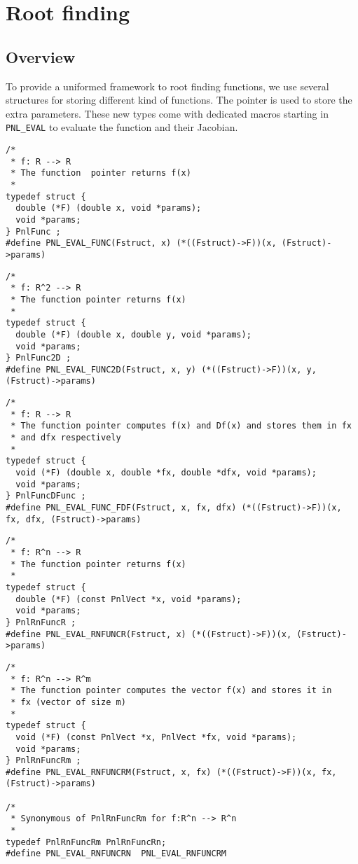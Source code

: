 \section{Root finding}
\subsection{Overview}
\label{sec:PnlFunc}

To provide a uniformed framework to root finding functions, we use several
structures for storing different kind of functions. The pointer
 is used to store the extra parameters. These new types come
with dedicated macros starting in \verb!PNL_EVAL!  to evaluate the function
and their Jacobian.
\begin{verbatim}
/*
 * f: R --> R
 * The function  pointer returns f(x)
 *
typedef struct {
  double (*F) (double x, void *params);
  void *params;
} PnlFunc ;
#define PNL_EVAL_FUNC(Fstruct, x) (*((Fstruct)->F))(x, (Fstruct)->params)
\end{verbatim}

\begin{verbatim}
/*
 * f: R^2 --> R
 * The function pointer returns f(x)
 *
typedef struct {
  double (*F) (double x, double y, void *params);
  void *params;
} PnlFunc2D ;
#define PNL_EVAL_FUNC2D(Fstruct, x, y) (*((Fstruct)->F))(x, y, (Fstruct)->params)
\end{verbatim}

\begin{verbatim}
/*
 * f: R --> R
 * The function pointer computes f(x) and Df(x) and stores them in fx
 * and dfx respectively
 *
typedef struct {
  void (*F) (double x, double *fx, double *dfx, void *params);
  void *params;
} PnlFuncDFunc ;
#define PNL_EVAL_FUNC_FDF(Fstruct, x, fx, dfx) (*((Fstruct)->F))(x, fx, dfx, (Fstruct)->params)
\end{verbatim}

\begin{verbatim}
/*
 * f: R^n --> R
 * The function pointer returns f(x)
 *
typedef struct {
  double (*F) (const PnlVect *x, void *params);
  void *params;
} PnlRnFuncR ;
#define PNL_EVAL_RNFUNCR(Fstruct, x) (*((Fstruct)->F))(x, (Fstruct)->params)
\end{verbatim}

\begin{verbatim}
/*
 * f: R^n --> R^m
 * The function pointer computes the vector f(x) and stores it in
 * fx (vector of size m)
 *
typedef struct {
  void (*F) (const PnlVect *x, PnlVect *fx, void *params);
  void *params;
} PnlRnFuncRm ;
#define PNL_EVAL_RNFUNCRM(Fstruct, x, fx) (*((Fstruct)->F))(x, fx, (Fstruct)->params)

/*
 * Synonymous of PnlRnFuncRm for f:R^n --> R^n
 *
typedef PnlRnFuncRm PnlRnFuncRn;
#define PNL_EVAL_RNFUNCRN  PNL_EVAL_RNFUNCRM
\end{verbatim}

